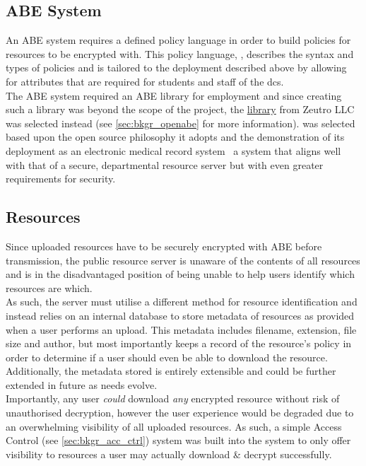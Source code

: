 \subsection{ABE System}
\label{subsec:design_abe_sys}

An ABE system requires a defined policy language in order to build policies for resources to be encrypted with. This policy language, \thePolicyLang, describes the syntax and types of policies and is tailored to the deployment described above by allowing for attributes that are required for students and staff of the \acrshort{dcs}.\\
The ABE system required an ABE library for employment and since creating such a library was beyond the scope of the project, the \href{https://github.com/zeutro/openabe}{\OpenABE library} from Zeutro LLC was selected instead (see \cref{sec:bkgr_openabe} for more information). \OpenABE was selected based upon the open source philosophy it adopts and the demonstration of its deployment as an electronic medical record system \citet{Akinyele2011} \textemdash\ a system that aligns well with that of a secure, departmental resource server but with even greater requirements for security.

\subsection{Resources}
\label{subsec:design_resources}

Since uploaded resources have to be securely encrypted with ABE before transmission, the public resource server is unaware of the contents of all resources and is in the disadvantaged position of being unable to help users identify which resources are which.\\
As such, the server must utilise a different method for resource identification and instead relies on an internal database to store metadata of resources as provided when a user performs an upload. This metadata includes filename, extension, file size and author, but most importantly keeps a record of the resource's policy in order to determine if a user should even be able to download the resource. Additionally, the metadata stored is entirely extensible and could be further extended in future as needs evolve.\\
Importantly, any user \textit{could} download \textit{any} encrypted resource without risk of unauthorised decryption, however the user experience would be degraded due to an overwhelming visibility of all uploaded resources. As such, a simple Access Control (see \cref{sec:bkgr_acc_ctrl}) system was built into the system to only offer visibility to resources a user may actually download \& decrypt successfully.
